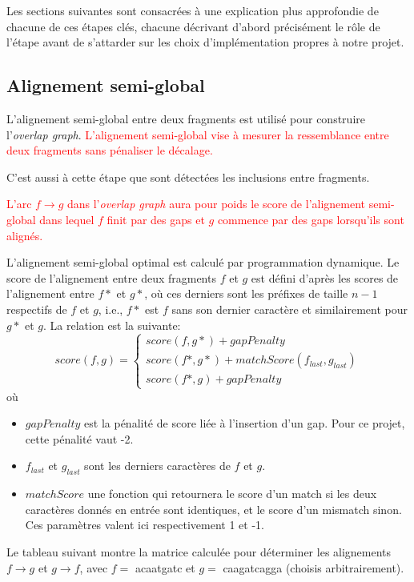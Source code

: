 \documentclass{article}
\begin{document}
Les sections suivantes sont consacrées à une explication plus approfondie de chacune de ces étapes clés, chacune décrivant d'abord précisément le rôle de l'étape avant de s'attarder sur les choix d'implémentation propres à notre projet.

\subsection{Alignement semi-global}

L'alignement semi-global entre deux fragments est utilisé pour construire l'\textit{overlap graph}. \textcolor{red}{L'alignement semi-global vise à mesurer la ressemblance entre deux fragments sans pénaliser le décalage.} 

C'est aussi à cette étape que sont détectées les inclusions entre fragments.

\textcolor{red}{
L'arc $f \to g$ dans l'\textit{overlap graph} aura pour poids le score de l'alignement semi-global dans lequel $f$ finit par des gaps et $g$ commence par des gaps lorsqu'ils sont alignés.}

L'alignement semi-global optimal est calculé par programmation dynamique. 
Le score de l'alignement entre deux fragments $f$ et $g$ est défini d'après les scores de l'alignement entre $f*$ et $g*$, où ces derniers sont les préfixes de taille $n-1$ respectifs de $f$ et $g$, i.e., $f*$ est $f$ sans son dernier caractère et similairement pour $g*$ et $g$.
La relation est la suivante:
$$score(f, g) = 
 \left\{
    \begin{array}{ll}
        score(f,g*)+gapPenalty \\
        score(f*,g*)+matchScore(f_{last}, g_{last})\\
        score(f*,g)+gapPenalty
    \end{array}
\right.$$
où 
\begin{itemize}
\item $gapPenalty$ est la pénalité de score liée à l'insertion d'un gap. Pour ce projet, cette pénalité vaut -2.
\item $f_{last}$ et $g_{last}$ sont les derniers caractères de $f$ et $g$.
\item $matchScore$ une fonction qui retournera le score d'un match si les deux caractères donnés en entrée sont identiques, et le score d'un mismatch sinon. Ces paramètres valent ici respectivement 1 et -1.
\end{itemize} 

\newpage
Le tableau suivant montre la matrice calculée pour déterminer les alignements $f \to g$ et $g \to f$, avec $f =$ acaatgatc et $g =$ caagatcagga (choisis arbitrairement).
\end{document}
